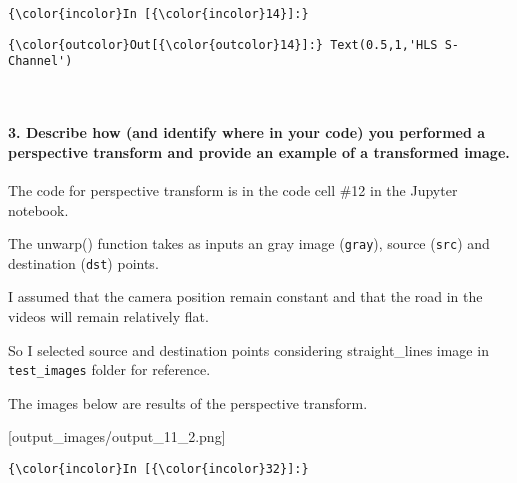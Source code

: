 \documentclass[11pt]{article}
\begin{document}
    \begin{Verbatim}[commandchars=\\\{\}]
{\color{incolor}In [{\color{incolor}14}]:} 
\end{Verbatim}


\begin{Verbatim}[commandchars=\\\{\}]
{\color{outcolor}Out[{\color{outcolor}14}]:} Text(0.5,1,'HLS S-Channel')
\end{Verbatim}
            
    \begin{center}
    \end{center}
    { \hspace*{\fill} \\}
    
    \hypertarget{describe-how-and-identify-where-in-your-code-you-performed-a-perspective-transform-and-provide-an-example-of-a-transformed-image.}{%
\paragraph{3. Describe how (and identify where in your code) you
performed a perspective transform and provide an example of a
transformed
image.}\label{describe-how-and-identify-where-in-your-code-you-performed-a-perspective-transform-and-provide-an-example-of-a-transformed-image.}}

The code for perspective transform is in the code cell \#12 in the
Jupyter notebook.

The unwarp() function takes as inputs an gray image (\texttt{gray}),
source (\texttt{src}) and destination (\texttt{dst}) points.

I assumed that the camera position remain constant and that the road in
the videos will remain relatively flat.

So I selected source and destination points considering straight\_lines
image in \texttt{test\_images} folder for reference.

The images below are results of the perspective transform.

{[}output\_images/output\_11\_2.png{]}

    \begin{Verbatim}[commandchars=\\\{\}]
{\color{incolor}In [{\color{incolor}32}]:} 
\end{Verbatim}
\end{document}
